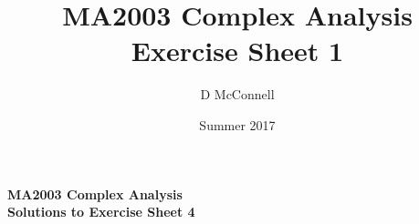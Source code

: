 \documentclass[oneside, 11pt]{article}
\title{MA2003 Complex Analysis Exercise Sheet 1}
\author{D McConnell}
\date{Summer 2017}
\begin{document}
\begin{center}
{
\large\bf
MA2003 Complex Analysis \\
Solutions to Exercise Sheet 4 \\
}

\end{center}
\smallskip

\end{document}

